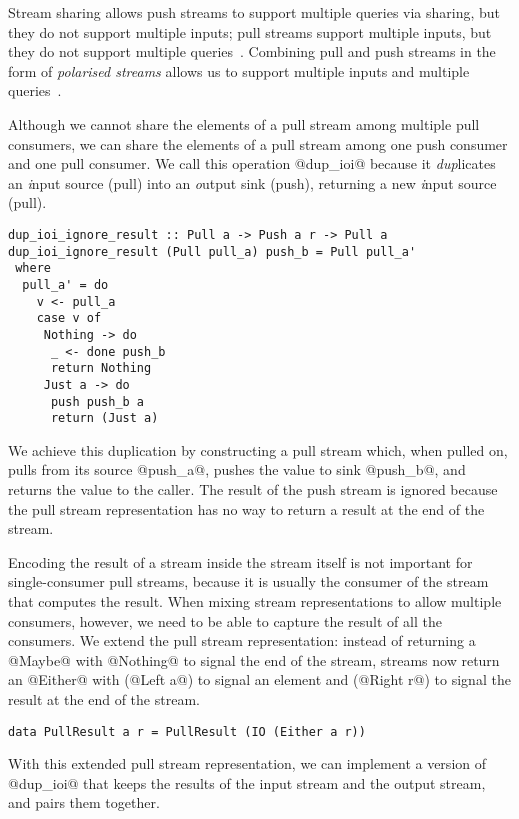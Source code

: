 Stream sharing allows push streams to support multiple queries via sharing, but they do not support multiple inputs; pull streams support multiple inputs, but they do not support multiple queries~\citep{kay2009you}.
Combining pull and push streams in the form of \emph{polarised streams} allows us to support multiple inputs and multiple queries~\citep{lippmeier2016polarized}.


Although we cannot share the elements of a pull stream among multiple pull consumers, we can share the elements of a pull stream among one push consumer and one pull consumer.
We call this operation @dup_ioi@ because it \emph{dup}licates an \emph{i}nput source (pull) into an \emph{o}utput sink (push), returning a new \emph{i}nput source (pull).

\begin{lstlisting}
dup_ioi_ignore_result :: Pull a -> Push a r -> Pull a
dup_ioi_ignore_result (Pull pull_a) push_b = Pull pull_a'
 where
  pull_a' = do
    v <- pull_a
    case v of
     Nothing -> do
      _ <- done push_b
      return Nothing
     Just a -> do
      push push_b a
      return (Just a)
\end{lstlisting}

We achieve this duplication by constructing a pull stream which, when pulled on, pulls from its source @push_a@, pushes the value to sink @push_b@, and returns the value to the caller.
The result of the push stream is ignored because the pull stream representation has no way to return a result at the end of the stream.

Encoding the result of a stream inside the stream itself is not important for single-consumer pull streams, because it is usually the consumer of the stream that computes the result.
When mixing stream representations to allow multiple consumers, however, we need to be able to capture the result of all the consumers.
We extend the pull stream representation: instead of returning a @Maybe@ with @Nothing@ to signal the end of the stream, streams now return an @Either@ with (@Left a@) to signal an element and (@Right r@) to signal the result at the end of the stream.

\begin{lstlisting}
data PullResult a r = PullResult (IO (Either a r))
\end{lstlisting}

With this extended pull stream representation, we can implement a version of @dup_ioi@ that keeps the results of the input stream and the output stream, and pairs them together.

